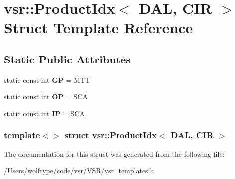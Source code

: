 \hypertarget{structvsr_1_1_product_idx_3_01_d_a_l_00_01_c_i_r_01_4}{\section{vsr\-:\-:Product\-Idx$<$ D\-A\-L, C\-I\-R $>$ Struct Template Reference}
\label{structvsr_1_1_product_idx_3_01_d_a_l_00_01_c_i_r_01_4}
}
\subsection*{Static Public Attributes}
\begin{DoxyCompactItemize}
\item 
\hypertarget{structvsr_1_1_product_idx_3_01_d_a_l_00_01_c_i_r_01_4_ae50aaac78de31468a8bf0454bcb1275a}{static const int {\bfseries G\-P} = M\-T\-T}\label{structvsr_1_1_product_idx_3_01_d_a_l_00_01_c_i_r_01_4_ae50aaac78de31468a8bf0454bcb1275a}

\item 
\hypertarget{structvsr_1_1_product_idx_3_01_d_a_l_00_01_c_i_r_01_4_a196bc6468d5114ad81b25827959d9d8b}{static const int {\bfseries O\-P} = S\-C\-A}\label{structvsr_1_1_product_idx_3_01_d_a_l_00_01_c_i_r_01_4_a196bc6468d5114ad81b25827959d9d8b}

\item 
\hypertarget{structvsr_1_1_product_idx_3_01_d_a_l_00_01_c_i_r_01_4_a814c2f9cc8e9450b81758d2fac9ac303}{static const int {\bfseries I\-P} = S\-C\-A}\label{structvsr_1_1_product_idx_3_01_d_a_l_00_01_c_i_r_01_4_a814c2f9cc8e9450b81758d2fac9ac303}

\end{DoxyCompactItemize}
\subsubsection*{template$<$$>$ struct vsr\-::\-Product\-Idx$<$ D\-A\-L, C\-I\-R $>$}



The documentation for this struct was generated from the following file\-:\begin{DoxyCompactItemize}
\item 
/\-Users/wolftype/code/vsr/\-V\-S\-R/vsr\-\_\-templates.\-h\end{DoxyCompactItemize}

